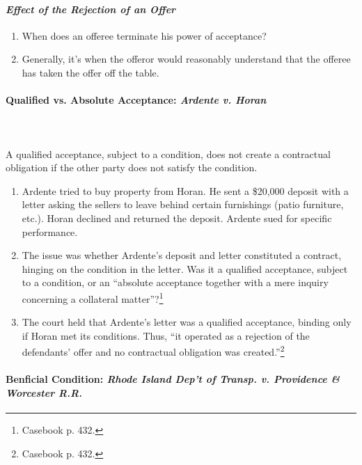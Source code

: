 \paragraph{\emph{Effect of the Rejection of an Offer}}

\begin{enumerate}
    \item When does an offeree terminate his power of acceptance?
    \item Generally, it's when the offeror would reasonably understand that 
    the offeree has taken the offer off the table.
\end{enumerate}

\paragraph{Qualified vs. Absolute Acceptance: \emph{Ardente v. Horan}}
~\\\\
A qualified acceptance, subject to a condition, does not create a contractual 
obligation if the other party does not satisfy the condition.

\begin{enumerate}
    \item Ardente tried to buy property from Horan. He sent a \$20,000 deposit 
    with a letter asking the sellers to leave behind certain furnishings 
    (patio furniture, etc.). Horan declined and returned the deposit. Ardente 
    sued for specific performance.
    \item The issue was whether Ardente's deposit and letter constituted a 
    contract, hinging on the condition in the letter. Was it a qualified 
    acceptance, subject to a condition, or an ``absolute acceptance together 
    with a mere inquiry concerning a collateral matter''?\footnote{Casebook 
    p. 432.}
    \item The court held that Ardente's letter was a qualified acceptance, 
    binding only if Horan met its conditions. Thus, ``it operated as a 
    rejection of the defendants' offer and no contractual obligation was 
    created.''\footnote{Casebook p. 432.}
\end{enumerate}

\paragraph{Benficial Condition: \emph{Rhode Island Dep't of Transp. v. 
Providence \& Worcester R.R.}}

